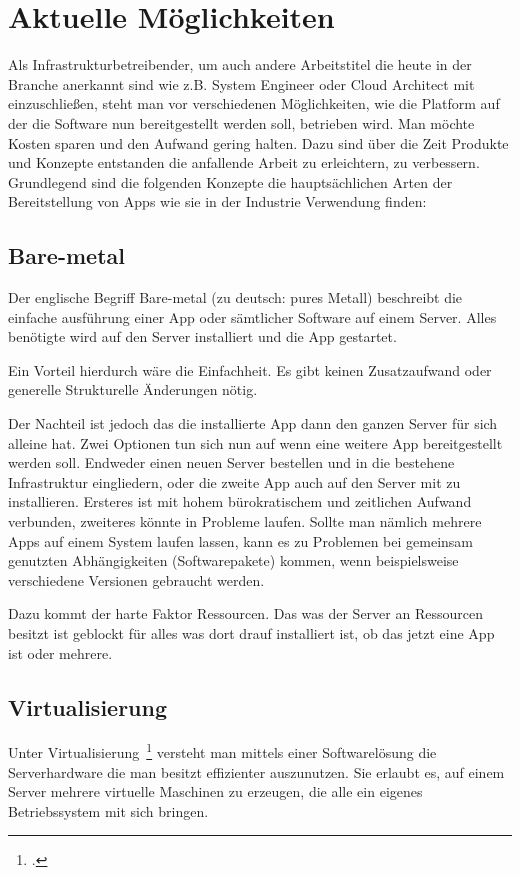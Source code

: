 \newpage
\section{Aktuelle Möglichkeiten}
Als Infrastrukturbetreibender, um auch andere Arbeitstitel die heute in der Branche anerkannt sind wie z.B. System Engineer oder Cloud Architect mit einzuschließen, 
steht man vor verschiedenen Möglichkeiten, wie die Platform auf der die Software nun bereitgestellt werden soll, betrieben wird. Man möchte Kosten sparen und den Aufwand gering halten.
Dazu sind über die Zeit Produkte und Konzepte entstanden die anfallende Arbeit zu erleichtern, zu verbessern.
Grundlegend sind die folgenden Konzepte die hauptsächlichen Arten der Bereitstellung von Apps wie sie in der Industrie Verwendung finden:

\subsection{Bare-metal}
Der englische Begriff Bare-metal (zu deutsch: pures Metall) beschreibt die einfache ausführung einer App oder sämtlicher Software auf einem Server. 
Alles benötigte wird auf den Server installiert und die App gestartet.

Ein Vorteil hierdurch wäre die Einfachheit. Es gibt keinen Zusatzaufwand oder generelle Strukturelle Änderungen nötig.

Der Nachteil ist jedoch das die installierte App dann den ganzen Server für sich alleine hat. Zwei Optionen tun sich nun auf wenn eine weitere App bereitgestellt werden soll. 
Endweder einen neuen Server bestellen und in die bestehene Infrastruktur eingliedern, oder die zweite App auch auf den Server mit zu installieren.
Ersteres ist mit hohem bürokratischem und zeitlichen Aufwand verbunden, zweiteres könnte in Probleme laufen. 
Sollte man nämlich mehrere Apps auf einem System laufen lassen, kann es zu Problemen bei gemeinsam genutzten Abhängigkeiten (Softwarepakete) kommen, wenn beispielsweise verschiedene Versionen gebraucht werden.

Dazu kommt der harte Faktor Ressourcen. Das was der Server an Ressourcen besitzt ist geblockt für alles was dort drauf installiert ist, ob das jetzt eine App ist oder mehrere.

\subsection{Virtualisierung}
Unter Virtualisierung~\footcite[Vgl. ][]{website:virtdock} versteht man mittels einer Softwarelösung die Serverhardware die man besitzt effizienter auszunutzen.
Sie erlaubt es, auf einem Server mehrere virtuelle Maschinen zu erzeugen, die alle ein eigenes Betriebssystem mit sich bringen.

